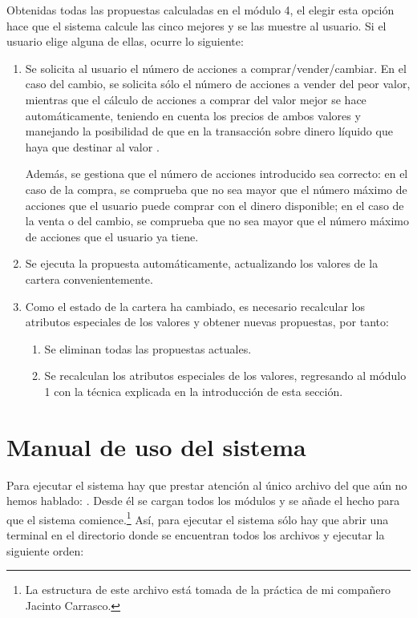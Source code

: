 \documentclass[a4paper, 11pt, titlepage]{article}
\begin{document}
    Obtenidas todas las propuestas calculadas en el módulo 4, el elegir esta opción hace que el sistema calcule las cinco mejores y se las muestre al usuario. Si el usuario elige alguna de ellas, ocurre lo siguiente:
    \begin{enumerate}
        \item Se solicita al usuario el número de acciones a comprar/vender/cambiar. En el caso del cambio, se solicita sólo el número de acciones a vender del peor valor, mientras que el cálculo de acciones a comprar del valor mejor se hace automáticamente, teniendo en cuenta los precios de ambos valores y manejando la posibilidad de que en la transacción sobre dinero líquido que haya que destinar al valor .

        Además, se gestiona que el número de acciones introducido sea correcto: en el caso de la compra, se comprueba que no sea mayor que el número máximo de acciones que el usuario puede comprar con el dinero disponible; en el caso de la venta o del cambio, se comprueba que no sea mayor que el número máximo de acciones que el usuario ya tiene.
        \item Se ejecuta la propuesta automáticamente, actualizando los valores de la cartera convenientemente.

        \item Como el estado de la cartera ha cambiado, es necesario recalcular los atributos especiales de los valores y obtener nuevas propuestas, por tanto:
        \begin{enumerate}[3.1.]
            \item Se eliminan todas las propuestas actuales.
            \item Se recalculan los atributos especiales de los valores, regresando al módulo 1 con la técnica explicada en la introducción de esta sección.
        \end{enumerate}
    \end{enumerate}

    \section{Manual de uso del sistema}

    Para ejecutar el sistema hay que prestar atención al único archivo del que aún no hemos hablado: . Desde él se cargan todos los módulos y se añade el hecho  para que el sistema comience.\footnote{La estructura de este archivo está tomada de la práctica de mi compañero Jacinto Carrasco.} Así, para ejecutar el sistema sólo hay que abrir una terminal en el directorio donde se encuentran todos los archivos y ejecutar la siguiente orden:
    \begin{center}
    \end{center}
\end{document}
